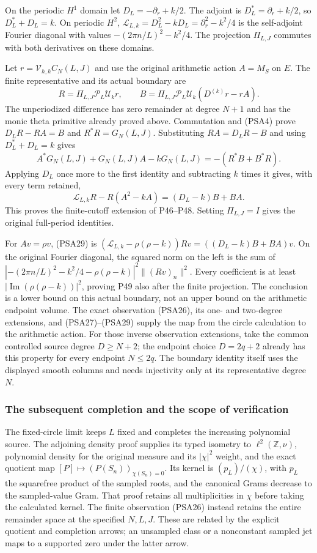 On the periodic $H^1$ domain let $D_L=-\partial_r+k/2$.
The adjoint is $D_L^*=\partial_r+k/2$, so $D_L^*+D_L=k$.
On periodic $H^2$, $\mathscr L_{L,k}=D_L^2-kD_L
=\partial_r^2-k^2/4$ is the self-adjoint Fourier diagonal with
values $-(2\pi n/L)^2-k^2/4$. The projection $\Pi_{L,J}$ commutes
with both derivatives on these domains.

Let $r=\mathcal V_{h,k}C_N(L,J)$ and use the original arithmetic
action $A=M_S$ on $E$. The finite representative and its actual
boundary are
\[
 R=\Pi_{L,J}\mathcal P_L\mathcal U_kr,\qquad
 B=\Pi_{L,J}\mathcal P_L\mathcal U_k(D^{(k)}r-rA).
 \tag{PSA27}
\]
The unperiodized difference has zero remainder at degree $N+1$ and
has the monic theta primitive already proved above. Commutation and
(PSA4) prove $D_LR-RA=B$ and $R^*R=G_N(L,J)$. Substituting
$RA=D_LR-B$ and using $D_L^*+D_L=k$ gives
\[
 A^*G_N(L,J)+G_N(L,J)A-kG_N(L,J)
 =-(R^*B+B^*R).
 \tag{PSA28}
\]
Applying $D_L$ once more to the first identity and subtracting $k$
times it gives, with every term retained,
\[
 \mathscr L_{L,k}R-R(A^2-kA)=(D_L-k)B+BA.
 \tag{PSA29}
\]
This proves the finite-cutoff extension of P46--P48. Setting
$\Pi_{L,J}=I$ gives the original full-period identities.

For $Av=\rho v$, (PSA29) is
$(\mathscr L_{L,k}-\rho(\rho-k))Rv=((D_L-k)B+BA)v$.
On the original Fourier diagonal, the squared norm on the left is
the sum of
$|-(2\pi n/L)^2-k^2/4-\rho(\rho-k)|^2\|(Rv)_n\|^2$.
Every coefficient is at least
$|\operatorname{Im}(\rho(\rho-k))|^2$, proving P49 also after the
finite projection. The conclusion is a lower bound on this actual
boundary, not an upper bound on the arithmetic endpoint volume.
The exact observation (PSA26), its one- and two-degree extensions,
and (PSA27)--(PSA29) supply the map from the circle calculation to
the arithmetic action.
For those inverse observation extensions, take the common controlled
source degree $D\ge N+2$; the endpoint choice $D=2q+2$ already has
this property for every endpoint $N\le2q$. The boundary identity
itself uses the displayed smooth columns and needs injectivity only
at its representative degree $N$.

\subsubsection{The subsequent completion and the scope of verification}

The fixed-circle limit keeps $L$ fixed and completes the increasing
polynomial source. The adjoining density proof supplies its typed
isometry to $\ell^2(\mathbb Z,\nu)$, polynomial density for the
original measure and its $|\chi|^2$ weight, and the exact quotient
map $[P]\mapsto(P(S_n))_{\chi(S_n)=0}$. Its kernel is
$(p_L)/(\chi)$, with $p_L$ the squarefree product of the sampled
roots, and the canonical Grams decrease to the sampled-value Gram.
That proof retains all multiplicities in $\chi$ before taking the
calculated kernel. The finite observation (PSA26) instead retains
the entire remainder space at the specified $N,L,J$. These are
related by the explicit quotient and completion arrows; an
unsampled class or a nonconstant sampled jet maps to a supported
zero under the latter arrow.

